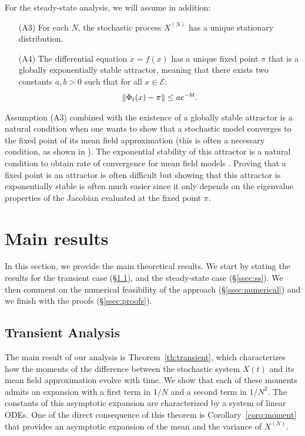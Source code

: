 \documentclass[sigconf]{acmart}
\newcommand\XN{X^{(N)}}
\newcommand\E{\mathcal{E}}
\newcommand\norm[1]{{\mathchoice{\bnorm{#1}}{\snorm{#1}}{\snorm{#1}}{\snorm{#1}}}}
\newcommand\bnorm[1]{\left\|#1\right\|}
\newcommand\snorm[1]{\|#1\|}
\begin{document}
For the steady-state analysis, we will assume in addition:
\begin{itemize}
\item[(A3)] For each $N$, the stochastic process $\XN$ has a unique
  stationary distribution.
\item[(A4)] The differential equation $\dot{x}=f(x)$ has a unique
  fixed point $\pi$ that is a globally exponentially stable attractor,
  meaning that there exists two constants $a,b>0$ such that for all
  $x\in\E$:
  \begin{align*}
    \norm{\Phi_t(x) - \pi} \le a e^{-bt}. 
  \end{align*}
\end{itemize}
Assumption (A3) combined with the existence of a globally stable
attractor is a natural condition when one wants to show that a
stochastic model converges to the fixed point of its mean field
approximation (this is often a necessary condition, as shown in
\cite{benaim2008class,cho2012asymptotic}). The exponential stability
of this attractor is a natural condition to obtain rate of convergence
for mean field models \cite{ying2016rate,gast2017expected}.  Proving
that a fixed point is an attractor is often difficult but showing that
this attractor is exponentially stable is often much easier since it
only depends on the eigenvalue properties of the Jacobian evaluated at
the fixed point $\pi$.

\section{Main results}
\label{sec:theory}

In this section, we provide the main theoretical results. We start by
stating the results for the transient case (\S\ref{ssec:transient}),
and the steady-state case (\S\ref{ssec:ss}). We then comment on the
numerical feasibility of the approach (\S\ref{ssec:numerical}) and we
finish with the proofs (\S\ref{ssec:proofs}).

\subsection{Transient Analysis}
\label{ssec:transient}

The main result of our analysis is Theorem~\ref{th:transient}, which
characterizes how the moments of the difference between the stochastic
system $X(t)$ and its mean field approximation evolve with time. We
show that each of these moments admits an expansion with a first term
in $1/N$ and a second term in $1/N^2$. The constants of this
asymptotic expansion are characterized by a system of linear ODEs. One
of the direct consequence of this theorem is
Corollary~\ref{coro:moment} that provides an asymptotic expansion of
the mean and the variance of $\XN$.
\end{document}

